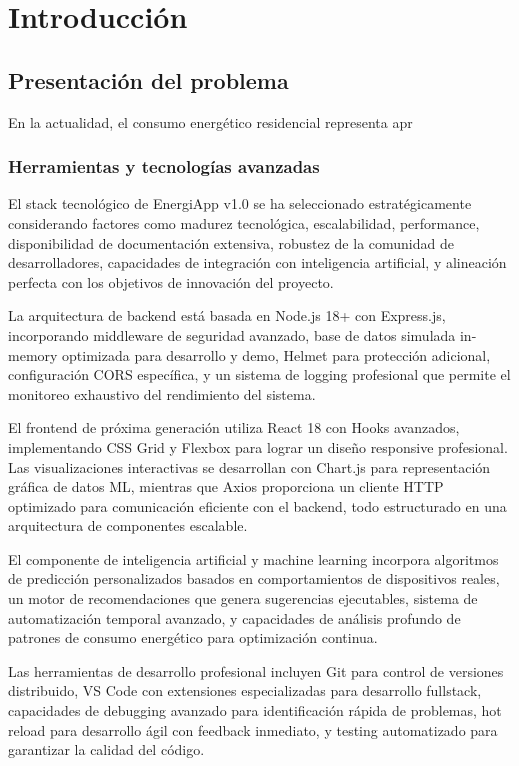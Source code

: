 \chapter{Introducción}
\label{ch:introduccion}

\section{Presentación del problema}

En la actualidad, el consumo energético residencial representa apr\subsection{Herramientas y tecnologías avanzadas}

El stack tecnológico de EnergiApp v1.0 se ha seleccionado estratégicamente considerando factores como madurez tecnológica, escalabilidad, performance, disponibilidad de documentación extensiva, robustez de la comunidad de desarrolladores, capacidades de integración con inteligencia artificial, y alineación perfecta con los objetivos de innovación del proyecto.

La arquitectura de backend está basada en Node.js 18+ con Express.js, incorporando middleware de seguridad avanzado, base de datos simulada in-memory optimizada para desarrollo y demo, Helmet para protección adicional, configuración CORS específica, y un sistema de logging profesional que permite el monitoreo exhaustivo del rendimiento del sistema.

El frontend de próxima generación utiliza React 18 con Hooks avanzados, implementando CSS Grid y Flexbox para lograr un diseño responsive profesional. Las visualizaciones interactivas se desarrollan con Chart.js para representación gráfica de datos ML, mientras que Axios proporciona un cliente HTTP optimizado para comunicación eficiente con el backend, todo estructurado en una arquitectura de componentes escalable.

El componente de inteligencia artificial y machine learning incorpora algoritmos de predicción personalizados basados en comportamientos de dispositivos reales, un motor de recomendaciones que genera sugerencias ejecutables, sistema de automatización temporal avanzado, y capacidades de análisis profundo de patrones de consumo energético para optimización continua.

Las herramientas de desarrollo profesional incluyen Git para control de versiones distribuido, VS Code con extensiones especializadas para desarrollo fullstack, capacidades de debugging avanzado para identificación rápida de problemas, hot reload para desarrollo ágil con feedback inmediato, y testing automatizado para garantizar la calidad del código.

